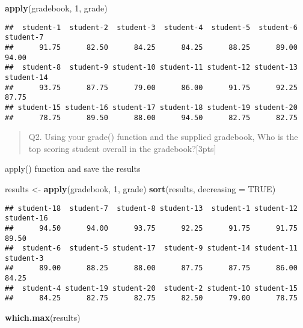 \documentclass[
]{article}
\newenvironment{Shaded}{\begin{snugshade}}{\end{snugshade}}
\newcommand{\AttributeTok}[1]{\textcolor[rgb]{0.13,0.29,0.53}{#1}}
\newcommand{\ConstantTok}[1]{\textcolor[rgb]{0.56,0.35,0.01}{#1}}
\newcommand{\DecValTok}[1]{\textcolor[rgb]{0.00,0.00,0.81}{#1}}
\newcommand{\FunctionTok}[1]{\textcolor[rgb]{0.13,0.29,0.53}{\textbf{#1}}}
\newcommand{\NormalTok}[1]{#1}
\newcommand{\OtherTok}[1]{\textcolor[rgb]{0.56,0.35,0.01}{#1}}
\begin{document}
\begin{Shaded}
\begin{Highlighting}[]
\FunctionTok{apply}\NormalTok{(gradebook, }\DecValTok{1}\NormalTok{, grade)}
\end{Highlighting}
\end{Shaded}

\begin{verbatim}
##  student-1  student-2  student-3  student-4  student-5  student-6  student-7 
##      91.75      82.50      84.25      84.25      88.25      89.00      94.00 
##  student-8  student-9 student-10 student-11 student-12 student-13 student-14 
##      93.75      87.75      79.00      86.00      91.75      92.25      87.75 
## student-15 student-16 student-17 student-18 student-19 student-20 
##      78.75      89.50      88.00      94.50      82.75      82.75
\end{verbatim}

\begin{quote}
Q2. Using your grade() function and the supplied gradebook, Who is the
top scoring student overall in the gradebook?{[}3pts{]}
\end{quote}

apply() function and save the results

\begin{Shaded}
\begin{Highlighting}[]
\NormalTok{results }\OtherTok{\textless{}{-}} \FunctionTok{apply}\NormalTok{(gradebook, }\DecValTok{1}\NormalTok{, grade)}
\FunctionTok{sort}\NormalTok{(results, }\AttributeTok{decreasing =} \ConstantTok{TRUE}\NormalTok{)}
\end{Highlighting}
\end{Shaded}

\begin{verbatim}
## student-18  student-7  student-8 student-13  student-1 student-12 student-16 
##      94.50      94.00      93.75      92.25      91.75      91.75      89.50 
##  student-6  student-5 student-17  student-9 student-14 student-11  student-3 
##      89.00      88.25      88.00      87.75      87.75      86.00      84.25 
##  student-4 student-19 student-20  student-2 student-10 student-15 
##      84.25      82.75      82.75      82.50      79.00      78.75
\end{verbatim}

\begin{Shaded}
\begin{Highlighting}[]
\FunctionTok{which.max}\NormalTok{(results)}
\end{Highlighting}
\end{Shaded}
\end{document}

